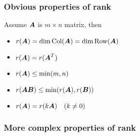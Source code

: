 \documentclass{overview}
\begin{document}
\subsubsection{Obvious properties of rank}

Assume $\boldsymbol{A}$ is $m\times n$ matrix, then

\begin{itemize}
	\item $r(\boldsymbol{A}) = \dim \text{Col}(\boldsymbol{A}) = \dim \text{Row}(\boldsymbol{A})$
	\item $r(\boldsymbol{A}) = r(\boldsymbol{A}^T)$
	\item $r(\boldsymbol{A}) \leq \min(m,n)$
	\item $r(\boldsymbol{A}\boldsymbol{B}) \leq \min(r(\boldsymbol{A}), r(\boldsymbol{B}))$
	\item $r(\boldsymbol{A})=r(k\boldsymbol{A})\quad(k\ne 0)$
\end{itemize}

\subsubsection{More complex properties of rank}
\end{document}

